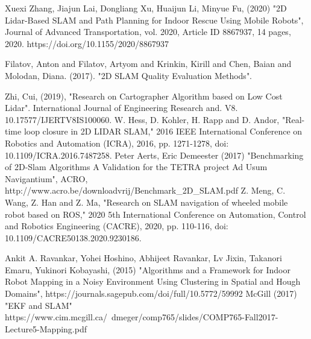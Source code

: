 \documentclass[12pt, a4paper, onecolumn]{article}
\begin{document}
\newpage
\begin{thebibliography}{9}
Xuexi Zhang, Jiajun Lai, Dongliang Xu, Huaijun Li, Minyue Fu, (2020) "2D Lidar-Based SLAM and Path Planning for Indoor Rescue Using Mobile Robots", Journal of Advanced Transportation, vol. 2020, Article ID 8867937, 14 pages, 2020. https://doi.org/10.1155/2020/8867937

Filatov, Anton and Filatov, Artyom and Krinkin, Kirill and Chen, Baian and Molodan, Diana. (2017). "2D SLAM Quality Evaluation Methods". 

Zhi, Cui, (2019), "Research on Cartographer Algorithm based on Low Cost Lidar". International Journal of Engineering Research and. V8. 10.17577/IJERTV8IS100060. 
W. Hess, D. Kohler, H. Rapp and D. Andor, "Real-time loop closure in 2D LIDAR SLAM," 2016 IEEE International Conference on Robotics and Automation (ICRA), 2016, pp. 1271-1278, doi: 10.1109/ICRA.2016.7487258.
Peter Aerts, Eric Demeester (2017) "Benchmarking of 2D-Slam Algorithms
A Validation for the TETRA project Ad Usum Navigantium", ACRO, http://www.acro.be/downloadvrij/Benchmark{\_}2D{\_}SLAM.pdf
Z. Meng, C. Wang, Z. Han and Z. Ma, "Research on SLAM navigation of wheeled mobile robot based on ROS," 2020 5th International Conference on Automation, Control and Robotics Engineering (CACRE), 2020, pp. 110-116, doi: 10.1109/CACRE50138.2020.9230186.

  Ankit A. Ravankar, Yohei Hoshino, Abhijeet Ravankar, Lv Jixin, Takanori Emaru, Yukinori Kobayashi, (2015) "Algorithms and a Framework for Indoor Robot Mapping in a Noisy Environment Using Clustering in Spatial and Hough Domains", https://journals.sagepub.com/doi/full/10.5772/59992
  McGill (2017) "EKF and SLAM" https://www.cim.mcgill.ca/~dmeger/comp765/slides/COMP765-Fall2017-Lecture5-Mapping.pdf
\end{thebibliography}
\end{document}

